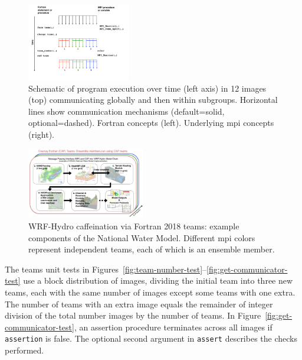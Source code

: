 \begin{figure}
\includegraphics[width=0.4\textwidth]{figures/teams}
\vspace{-24pt}
\caption{Schematic of program execution over time
  (left axis) in 12 images (top) communicating globally and then within subgroups.  Horizontal lines show communication mechanisms (default=solid, optional=dashed).  Fortran concepts (left).  Underlying \gls{mpi} concepts (right).\label{fig:teams}}
\end{figure}
%

\begin{figure}
\includegraphics[width=0.46\textwidth]{figures/WRF-Hydro-caf-ens-model_chain.png}
\vspace{-10pt}
\caption{WRF-Hydro caffeination via Fortran 2018
  teams: example components of  the National Water
  Model. Different \gls{mpi} colors represent independent teams,
  each of which is an ensemble member.
  \label{fig:caffeinate-wrf-hydro}}
\end{figure}
%

The teams unit tests in
Figures~\ref{fig:team-number-test}--\ref{fig:get-communicator-test} use a block distribution of images,
dividing the initial team into three new teams, each with the same number of images except some teams
with one extra. The number of teams with an extra image equals the remainder of integer division of the total
number images by the number of teams. In Figure~\ref{fig:get-communicator-test}, an assertion procedure
terminates across all images if \texttt{assertion} is false.  The optional second argument in \texttt{assert}
describes the checks performed.

